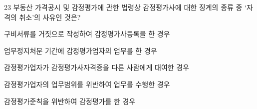 \begin{question}{23}
부동산 가격공시 및 감정평가에 관한 법령상 감정평가사에 대한 징계의 종류 중 ‘자격의 취소’의 사유인 것은?
\begin{choices}
  \item 구비서류를 거짓으로 작성하여 감정평가사등록을 한 경우
  \item 업무정지처분 기간에 감정평가업자의 업무를 한 경우
  \item 감정평가업자가 감정평가사자격증을 다른 사람에게 대여한 경우
  \item 감정평가업자의 업무범위를 위반하여 업무를 수행한 경우
  \item 감정평가준칙을 위반하여 감정평가를 한 경우
\end{choices}
\end{question}

